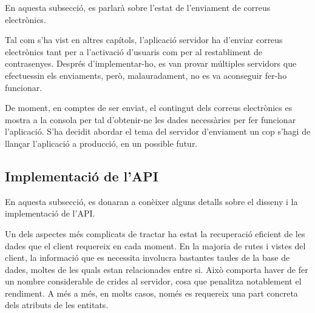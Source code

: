 \documentclass[a4paper,12pt]{ThesisStyle}
\begin{document}
En aquesta subsecció, es parlarà sobre l'estat de l'enviament de correus electrònics.

Tal com s'ha vist en altres capítols, l'aplicació servidor ha d'enviar correus electrònics tant per a l'activació d'usuaris com per al restabliment de contrasenyes. Després d'implementar-ho, es van provar múltiples servidors que efectuessin els enviaments, però, malauradament, no es va aconseguir fer-ho funcionar.

De moment, en comptes de ser enviat, el contingut dels correus electrònics es mostra a la consola per tal d'obtenir-ne les dades necessàries per fer funcionar l'aplicació. S'ha decidit abordar el tema del servidor d'enviament un cop s'hagi de llançar l'aplicació a producció, en un possible futur.

\subsection{Implementació de l'API}
\label{subsec:api}

En aquesta subsecció, es donaran a conèixer alguns detalls sobre el disseny i la implementació de l'API.

Un dels aspectes més complicats de tractar ha estat la recuperació eficient de les dades que el client requereix en cada moment. En la majoria de rutes i vistes del client, la informació que es necessita involucra bastantes taules de la base de dades, moltes de les quals estan relacionades entre si. Això comporta haver de fer un nombre considerable de crides al servidor, cosa que penalitza notablement el rendiment. A més a més, en molts casos, només es requereix una part concreta dels atributs de les entitats. 
\end{document}
